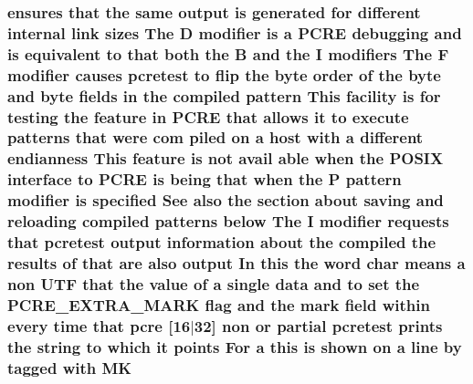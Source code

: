 \subsubsection[{\texorpdfstring{MK}{MK}}]{ ensures that the same {\bf output} {\bf is} {\bf generated} for different internal link sizes The {\bf D} {\bf modifier} {\bf is} {\bf a} {\bf P\+C\+RE} debugging and {\bf is} equivalent {\bf to} that both the {\bf B} and the {\bf I} {\bf modifiers} The {\bf F} {\bf modifier} causes {\bf pcretest} {\bf to} flip the byte {\bf order} {\bf of} the byte and byte {\bf fields} {\bf in} the {\bf compiled} {\bf pattern} This {\bf facility} {\bf is} for testing the {\bf feature} {\bf in} {\bf P\+C\+RE} that allows {\bf it} {\bf to} execute {\bf patterns} that were com piled {\bf on} {\bf a} {\bf host} {\bf with} {\bf a} different endianness This {\bf feature} {\bf is} {\bf not} avail {\bf able} when the P\+O\+S\+IX interface {\bf to} {\bf P\+C\+RE} {\bf is} being that when the P {\bf pattern} {\bf modifier} {\bf is} {\bf specified} See also the {\bf section} about saving and reloading {\bf compiled} {\bf patterns} {\bf below} The {\bf I} {\bf modifier} {\bf requests} that {\bf pcretest} {\bf output} information about the {\bf compiled} the {\bf results} {\bf of} that {\bf are} also {\bf output} In {\bf this} the {\bf word} char means {\bf a} non U\+TF that the {\bf value} {\bf of} {\bf a} single {\bf data} and {\bf to} {\bf set} the {\bf P\+C\+R\+E\+\_\+\+E\+X\+T\+R\+A\+\_\+\+M\+A\+RK} {\bf flag} and the {\bf mark} {\bf field} within every {\bf time} that {\bf pcre} \mbox{[}16$\vert$32\mbox{]} non {\bf or} {\bf partial} {\bf pcretest} prints the {\bf string} {\bf to} {\bf which} {\bf it} points For {\bf a} {\bf this} {\bf is} shown {\bf on} {\bf a} {\bf line} by tagged {\bf with} MK}\hypertarget{pcretest_8txt_a3385a72cc9502bcb932d6975c225c038}{}\label{pcretest_8txt_a3385a72cc9502bcb932d6975c225c038}
